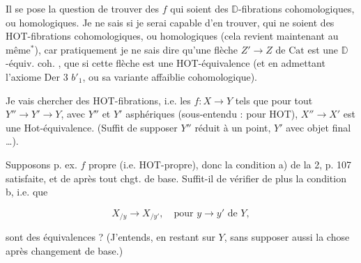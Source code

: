 

Il se pose la question de trouver des $f$ qui soient des $\mathbb D$-fibrations cohomologiques, ou homologiques. Je ne sais si je serai capable d'en trouver, qui ne soient  des HOT-fibrations cohomologiques, ou homologiques (cela revient maintenant au même$^*$), car pratiquement je ne sais  dire qu'une flèche $Z'\to Z$ de $\mathrm{Cat}$ est une $\mathbb D$-équiv. coh. , que si cette flèche est une HOT-équivalence (et en admettant l'axiome Der 3 $b'_1$, ou sa variante affaiblie cohomologique).


Je vais  chercher des HOT-fibrations, i.e. les $f:X\to Y$ tels que pour tout $Y''\to Y'\to Y$, avec $Y''$ et $Y'$  asphériques (sous-entendu : pour HOT), $X''\to X'$ est une Hot-équivalence. \unsure{[}(Suffit \unsure{$=$} de supposer $Y''$ réduit à un point, $Y'$ avec objet final \ldots{}).

Supposons p. ex. $f$ propre (i.e. HOT-propre),  donc la condition a) de la  2, p. 107 satisfaite, et de \unsure{$=$} après tout chgt. de base. Suffit-il de vérifier de plus la condition b, i.e. que

\[
X_{/y}\longrightarrow X_{/y'},\quad \text{pour }y\to y'\text{ de }Y,
\]

sont des équivalences ? (J'entends, en restant sur $Y$, sans supposer aussi  la \unsure{$=$} chose après changement de base.)


